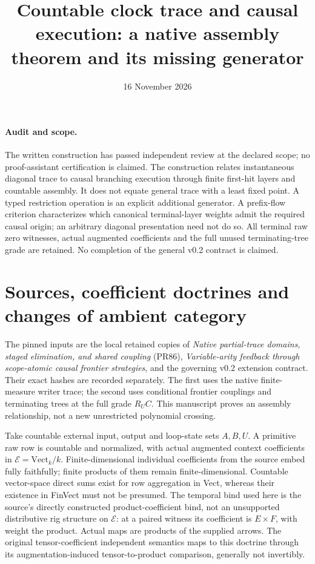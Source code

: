 \documentclass[11pt]{article}
\title{Countable clock trace and causal execution: a native assembly theorem and its missing generator}
\date{16 November 2026}
\newcommand{\E}{\mathcal E}\newcommand{\RR}{\overline{\mathbb R}_{\geq0}}
\begin{document}
\maketitle
\paragraph{Audit and scope.} The written construction has passed independent review at the declared scope; no proof-assistant certification is claimed. The construction relates instantaneous diagonal trace to causal branching execution through finite first-hit layers and countable assembly. It does not equate general trace with a least fixed point. A typed restriction operation is an explicit additional generator. A prefix-flow criterion characterizes which canonical terminal-layer weights admit the required causal origin; an arbitrary diagonal presentation need not do so. All terminal raw zero witnesses, actual augmented coefficients and the full unused terminating-tree grade are retained. No completion of the general v0.2 contract is claimed.

\section{Sources, coefficient doctrines and changes of ambient category}
The pinned inputs are the local retained copies of \emph{Native partial-trace domains, staged elimination, and shared coupling} (PR86), \emph{Variable-arity feedback through scope-atomic causal frontier strategies}, and the governing v0.2 extension contract. Their exact hashes are recorded separately. The first uses the native finite-measure writer trace; the second uses conditional frontier couplings and terminating trees at the full grade $R_UC$. This manuscript proves an assembly relationship, not a new unrestricted polynomial crossing.

Take countable external input, output and loop-state sets $A,B,U$. A primitive raw row is countable and normalized, with actual augmented context coefficients in $\E=\mathrm{Vect}_k/k$. Finite-dimensional individual coefficients from the source embed fully faithfully; finite products of them remain finite-dimensional. Countable vector-space direct sums exist for row aggregation in Vect, whereas their existence in FinVect must not be presumed. The temporal bind used here is the source's directly constructed product-coefficient bind, not an unsupported distributive rig structure on $\E$: at a paired witness its coefficient is $E\times F$, with weight the product. Actual maps are products of the supplied arrows. The original tensor-coefficient independent semantics maps to this doctrine through its augmentation-induced tensor-to-product comparison, generally not invertibly.
\end{document}
